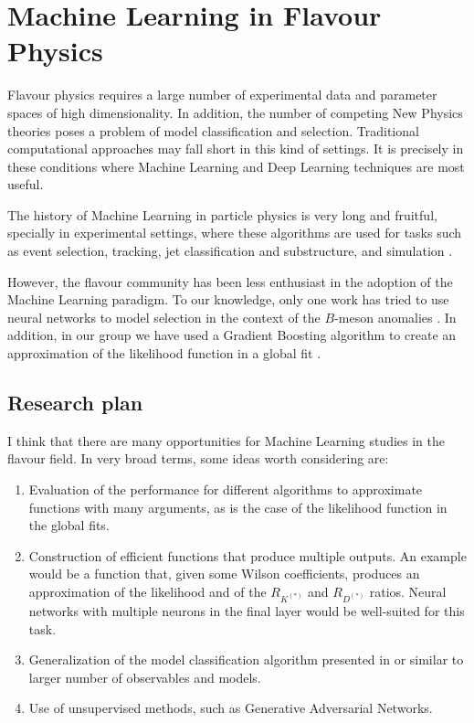 \documentclass[combined.tex]{subfiles}
\begin{document}
\section{Machine Learning in Flavour Physics}

Flavour physics requires a large number of experimental data and parameter spaces of high dimensionality. In addition, the number of competing New Physics theories poses a problem of model classification and selection. Traditional computational approaches may fall short in this kind of settings. It is precisely in these conditions where Machine Learning and Deep Learning techniques are most useful.

The history of Machine Learning in particle physics is very long and fruitful, specially in experimental settings, where these algorithms are used for tasks such as event selection, tracking, jet classification and substructure, and simulation \cite{Guest:2018yhq,Albertsson:2018maf,Schwartz:2021ftp,Alanazi:2021grv}. 

However, the flavour community has been less enthusiast in the adoption of the Machine Learning paradigm. To our knowledge, only one work has tried to use neural networks to model selection in the context of the $B$-meson anomalies \cite{Bhattacharya:2020vme}. In addition, in our group we have used a Gradient Boosting algorithm to create an approximation of the likelihood function in a global fit \cite{Alda:2021krg}.  

\subsection{Research plan}
I think that there are many opportunities for Machine Learning studies in the flavour field. In very broad terms, some ideas worth considering are:
\begin{enumerate}
\item Evaluation of the performance for different algorithms to approximate functions with many arguments, as is the case of the likelihood function in the global fits.
\item Construction of efficient functions that produce multiple outputs. An example would be a function that, given some Wilson coefficients, produces an approximation of the likelihood and of the $R_{K^{(*)}}$ and $R_{D^{(*)}} $ ratios. Neural networks with multiple neurons in the final layer would be well-suited for this task.
\item Generalization of the model classification algorithm presented in \cite{Bhattacharya:2020vme} or similar to larger number of observables and models.
\item Use of unsupervised methods, such as Generative Adversarial Networks.
\end{enumerate}
\end{document}
